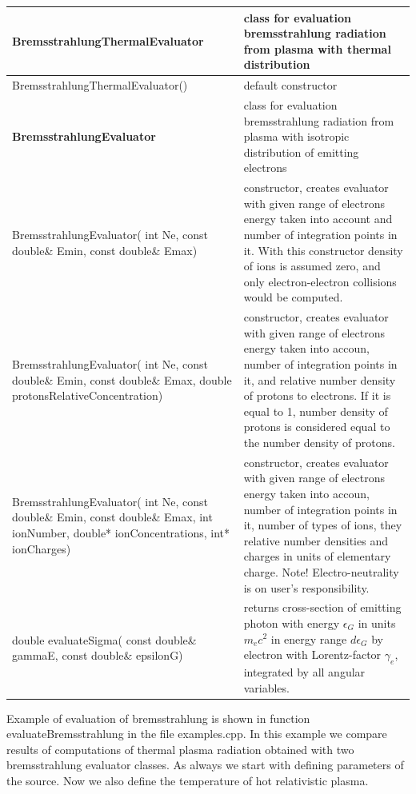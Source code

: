\begin{small}
	\label{bremsstrahlung}
	\begin{xtabular}{|p{0.5\textwidth}|p{0.5\textwidth}|}  
		\hline
		\textbf{BremsstrahlungThermalEvaluator} & class for evaluation bremsstrahlung radiation from plasma with thermal distribution\\
		\hline
		BremsstrahlungThermalEvaluator() & default constructor\\
		\hline
		\textbf{BremsstrahlungEvaluator} & class for evaluation bremsstrahlung radiation from plasma with isotropic distribution of emitting electrons\\
		\hline
		BremsstrahlungEvaluator( int Ne, const double\& Emin, const double\& Emax) & constructor, creates evaluator with given range of electrons energy taken into account and number of integration points in it. With this constructor density of ions is assumed zero, and only electron-electron collisions would be computed.\\
		\hline
		BremsstrahlungEvaluator( int Ne, const double\& Emin, const double\& Emax, double protonsRelativeConcentration) & constructor, creates evaluator with given range of electrons energy taken into accoun, number of integration points in it, and relative number density of protons to electrons. If it is equal to 1, number density of protons is considered equal to the number density of protons.\\
		\hline
		BremsstrahlungEvaluator( int Ne, const double\& Emin, const double\& Emax, int ionNumber, double* ionConcentrations, int* ionCharges) & constructor, creates evaluator with given range of electrons energy taken into accoun, number of integration points in it, number of types of ions, they relative number densities and charges in units of elementary charge. Note! Electro-neutrality is on user's responsibility.\\
		\hline
		double evaluateSigma( const double\& gammaE, const double\& epsilonG) & returns cross-section of emitting photon with energy $\epsilon_G$ in units $m_e c^2$ in energy range $d\epsilon_G$ by electron with Lorentz-factor $\gamma_e$, integrated by all angular variables.\\
		\hline
	\end{xtabular}
\end{small}

Example of evaluation of bremsstrahlung is shown in function  evaluateBremsstrahlung in the file examples.cpp. In this example we compare results of computations of thermal plasma radiation obtained with two bremsstrahlung evaluator classes. As always we start with defining parameters of the source. Now we also define the temperature of hot relativistic plasma.

